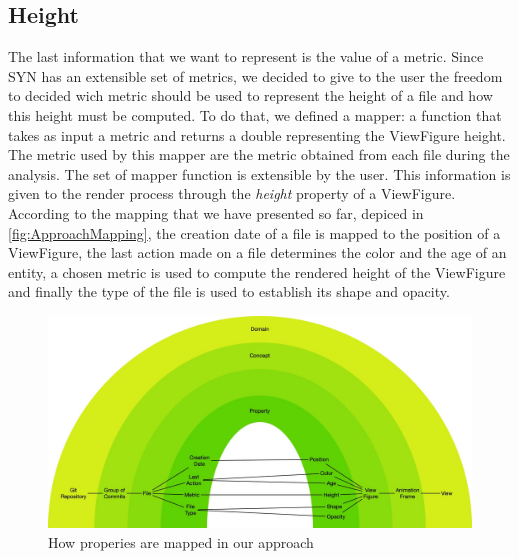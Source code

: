 \subsection*{Height}
The last information that we want to represent is the value of a metric. Since SYN has an extensible set of metrics, we decided to give to the user the freedom to decided wich metric should be used to represent the height of a file and how this height must be computed. 
To do that, we defined a mapper: a function that takes as input a metric and returns a double representing the ViewFigure height. The metric used by this mapper are the metric obtained from each file during the analysis. The set of mapper function is extensible by the user. \bigbreak
This information is given to the render process through the \textit{height} property of a ViewFigure.
\bigbreak
According to the mapping that we have presented so far, depiced in \autoref{fig:ApproachMapping}, the creation date of a file is mapped to the position of a ViewFigure, the last action made on a file determines the color and the age of an entity, a chosen metric is used to compute the rendered height of the ViewFigure and finally the type of the file is used to establish its shape and opacity. 


\begin{figure}
    \center
    \includegraphics[width=\textwidth]{ApproachMapping.jpg}
    \caption{How properies are mapped in our approach}
    \label{fig:ApproachMapping}
\end{figure}









